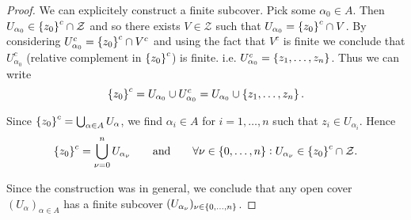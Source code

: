\begin{enumerate}[label = \textbf{Exercise \arabic*.},wide = 0pt, itemsep=1.5ex]
\begin{enumerate}[label = (\roman*),wide = 10pt, itemsep=1.5ex]
\begin{proof}
				We can explicitely construct a finite subcover. Pick some $\alpha_0 \in A$. Then $U_{\alpha_0} \in \cbr[0]{z_0}^c \cap \mathcal{Z}$ and so there exists $V \in \mathcal{Z}$ such that $U_{\alpha_0} = \cbr[0]{z_0}^c \cap V$. By considering $U_{\alpha_0}^c = \cbr[0]{z_0}^c \cap V^c$ and using the fact that $V^c$ is finite we conclude that $U_{\alpha_0}^c$ (relative complement in $\cbr[0]{z_0}^c$) is finite. i.e. $U_{\alpha_0}^c = \cbr[0]{z_1,\dots,z_n}$. Thus we can write 
		\begin{equation}
			\cbr[0]{z_0}^c = U_{\alpha_0} \cup U_{\alpha_0}^c = U_{\alpha_0} \cup \cbr[0]{z_1,\dots,z_n}.
		\end{equation}

		Since $\cbr[0]{z_0}^c = \bigcup_{\alpha \in A}U_\alpha$, we find $\alpha_i \in A$ for $i = 1,\dots,n$ such that $z_i \in U_{\alpha_i}$. Hence 		  
		\begin{equation}
			\cbr[0]{z_0}^c = \bigcup_{\nu = 0}^n  U_{\alpha_\nu} \qquad \text{and} \qquad \forall \nu \in\cbr[0]{0,\dots,n}:U_{\alpha_\nu} \in \cbr[0]{z_0}^c \cap \mathcal{Z}.	
		\end{equation}

		Since the construction was in general, we conclude that any open cover $(U_{\alpha})_{\alpha \in A}$ has a finite subcover $(U_{\alpha_\nu})_{\nu \in \cbr[0]{0,\dots,n}}$. 
		\end{proof}
		

\end{enumerate}
\end{enumerate}
